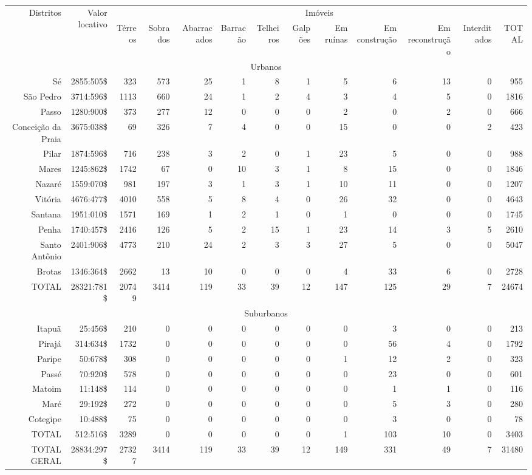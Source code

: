 \begin{sidewaystable*}[!htp]
\centering
{}
{
\begin{tiny}
\begin{tabular}{rrrrrrrrrrrrr}
\hline
\multirow{2}{*}{Distritos}&\multirow{2}{*}{Valor locativo}&\multicolumn{11}{c}{Imóveis}\\
\cline{3-13}
	&	&Térreos	&Sobrados	&Abarracados	&Barracão	&Telheiros	&Galpões	&Em ruínas	&Em construção	&Em reconstrução	&Interditados	&TOTAL\\
\hline 
\hline 
\multicolumn{13}{c}{Urbanos}\\
\hline 
Sé	&2855:505\$	&323	&573	&25	&1	&8	&1	&5	&6	&13	&0	&955\\
São Pedro	&3714:596\$	&1113	&660	&24	&1	&2	&4	&3	&4	&5	&0	&1816\\
Passo	&1280:900\$	&373	&277	&12	&0	&0	&0	&2	&0	&2	&0	&666\\
Conceição da Praia	&3675:038\$	&69	&326	&7	&4	&0	&0	&15	&0	&0	&2	&423\\
Pilar	&1874:596\$	&716	&238	&3	&2	&0	&1	&23	&5	&0	&0	&988\\
Mares	&1245:862\$	&1742	&67	&0	&10	&3	&1	&8	&15	&0	&0	&1846\\
Nazaré	&1559:070\$	&981	&197	&3	&1	&3	&1	&10	&11	&0	&0	&1207\\
Vitória	&4676:477\$	&4010	&558	&5	&8	&4	&0	&26	&32	&0	&0	&4643\\
Santana	&1951:010\$	&1571	&169	&1	&2	&1	&0	&1	&0	&0	&0	&1745\\
Penha	&1740:457\$	&2416	&126	&5	&2	&15	&1	&23	&14	&3	&5	&2610\\
Santo Antônio	&2401:906\$	&4773	&210	&24	&2	&3	&3	&27	&5	&0	&0	&5047\\
Brotas	&1346:364\$	&2662	&13	&10	&0	&0	&0	&4	&33	&6	&0	&2728\\
TOTAL 	&28321:781\$	&20749	&3414	&119	&33	&39	&12	&147	&125	&29	&7	&24674\\
\hline
\multicolumn{13}{c}{Suburbanos}\\
\hline
Itapuã	&25:456\$	&210	&0	&0	&0	&0	&0	&0	&3	&0	&0	&213\\
Pirajá	&314:634\$	&1732	&0	&0	&0	&0	&0	&0	&56	&4	&0	&1792\\
Paripe	&50:678\$	&308	&0	&0	&0	&0	&0	&1	&12	&2	&0	&323\\
Passé	&70:920\$	&578	&0	&0	&0	&0	&0	&0	&23	&0	&0	&601\\
Matoim	&11:148\$	&114	&0	&0	&0	&0	&0	&0	&1	&1	&0	&116\\
Maré	&29:192\$	&272	&0	&0	&0	&0	&0	&0	&5	&3	&0	&280\\
Cotegipe	&10:488\$	&75	&0	&0	&0	&0	&0	&0	&3	&0	&0	&78\\
TOTAL 	&512:516\$	&3289	&0	&0	&0	&0	&0	&1	&103	&10	&0	&3403\\
\hline
TOTAL GERAL	&28834:297\$	&27327	&3414	&119	&33	&39	&12	&149	&331	&49	&7	&31480\\
\hline
\end{tabular} 
\end{tiny}
}
{}
\end{sidewaystable*}